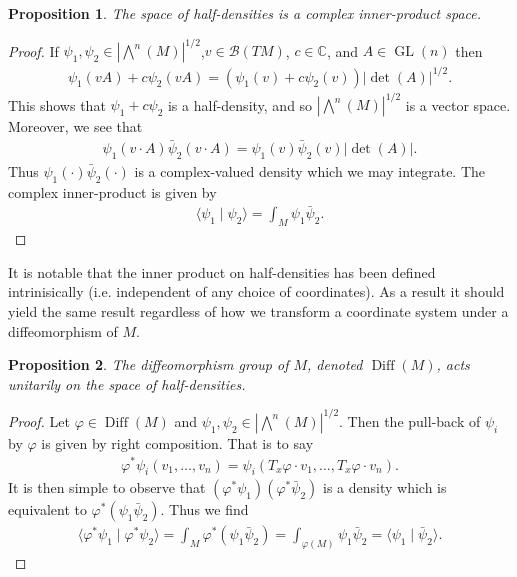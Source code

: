 \documentclass[12pt]{amsart}
\newtheorem{prop}{Proposition}
\DeclareMathOperator{\Diff}{Diff}
\DeclareMathOperator{\GL}{GL}
\begin{document}
\begin{prop}
  The space of half-densities is a complex inner-product space.
\end{prop}
\begin{proof}
 If $\psi_1,\psi_2 \in |\bigwedge^n(M)|^{1/2}$,$v \in \mathcal{B}(TM)$, $c \in \mathbb{C}$, and $A \in \GL(n)$ then
  \begin{align*}
    \psi_1( v A) + c  \psi_2(v A) = ( \psi_1(v) + c\psi_2(v) ) | \det(A) |^{1/2}.
  \end{align*}
  This shows that $\psi_1 + c \psi_2$ is a half-density, and so $|\bigwedge^n(M)|^{1/2}$ is a vector space.
  Moreover, we see that
  \begin{align*}
    \psi_1(v \cdot A) \bar{\psi}_2( v \cdot A) = \psi_1(v)\bar{\psi}_2(v) | \det(A) |.
  \end{align*}
  Thus $\psi_1( \cdot) \bar{\psi}_2( \cdot)$ is a complex-valued density which we may integrate.  The complex inner-product is given by
  \begin{align*}
    \langle \psi_1 \mid \psi_2 \rangle = \int_M \psi_1 \bar{\psi}_2.
  \end{align*}
\end{proof}

It is notable that the inner product on half-densities has been defined intrinisically (i.e. independent of any choice of coordinates).  As a result it should yield the same result regardless of how we transform a coordinate system under a diffeomorphism of $M$.

\begin{prop}
  The diffeomorphism group of $M$, denoted $\Diff(M)$, acts unitarily on the space of half-densities.
\end{prop}
\begin{proof}
  Let $\varphi \in \Diff(M)$ and $\psi_1,\psi_2 \in | \bigwedge^n(M) |^{1/2}$.  Then the pull-back of $\psi_i$ by $\varphi$ is given by right composition.  That is to say
  \begin{align*}
    \varphi^* \psi_i( v_1,\dots,v_n ) = \psi_i( T_x\varphi \cdot v_1,\dots,T_x\varphi \cdot v_n ).
  \end{align*}
  It is then simple to observe that $(\varphi^* \psi_1 ) (\varphi^* \bar{\psi}_2)$ is a density which is equivalent to $\varphi^*( \psi_1 \bar{\psi}_2)$.
  Thus we find
  \begin{align*}
    \langle \varphi^* \psi_1 \mid \varphi^* \psi_2 \rangle = \int_M \varphi^*( \psi_1 \bar{\psi}_2) = \int_{\varphi(M)} \psi_1 \bar{\psi}_2 = \langle \psi_1 \mid \bar{\psi}_2 \rangle.
  \end{align*}
\end{proof}
\end{document}
